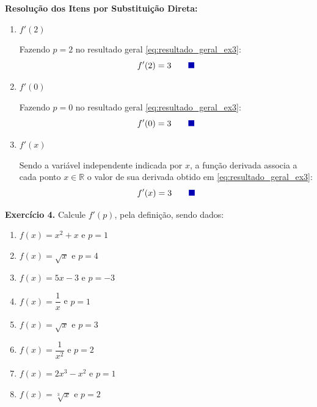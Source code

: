 \documentclass[12pt,a4paper]{article}
\newcommand{\qedsymbolmath}{\tag*{\textcolor{blue!70!black}{\rule{1.6ex}{1.6ex}}}}
\begin{document}
\vspace{0.3cm}
\textbf{Resolução dos Itens por Substituição Direta:}

\begin{enumerate}
    \renewcommand{\theenumi}{\alph{enumi}}
    \renewcommand{\labelenumi}{\theenumi)}
    \item $f'(2)$
    
    Fazendo $p = 2$ no resultado geral \eqref{eq:resultado_geral_ex3}:
    \begin{equation*}
        f'(2) = 3 \qedsymbolmath
    \end{equation*}

    \item $f'(0)$
    
    Fazendo $p = 0$ no resultado geral \eqref{eq:resultado_geral_ex3}:
    \begin{equation*}
        f'(0) = 3 \qedsymbolmath
    \end{equation*}

    \item $f'(x)$
    
    Sendo a variável independente indicada por $x$, a função derivada associa a cada ponto $x \in \mathbb{R}$ o valor de sua derivada obtido em \eqref{eq:resultado_geral_ex3}:
    \begin{equation*}
        f'(x) = 3 \qedsymbolmath
    \end{equation*}
\end{enumerate}

\vspace{0.5cm}
\noindent\textbf{Exercício 4.} Calcule $f'(p)$, pela definição, sendo dados:
\begin{enumerate}[label=\alph*)]
    \item $f(x) = x^2 + x$ e $p = 1$
    \item $f(x) = \sqrt{x}$ e $p = 4$
    \item $f(x) = 5x - 3$ e $p = -3$
    \item $f(x) = \dfrac{1}{x}$ e $p = 1$
    \item $f(x) = \sqrt{x}$ e $p = 3$
    \item $f(x) = \dfrac{1}{x^2}$ e $p = 2$
    \item $f(x) = 2x^3 - x^2$ e $p = 1$
    \item $f(x) = \sqrt[3]{x}$ e $p = 2$
\end{enumerate}
\setcounter{equation}{0}
\end{document}
